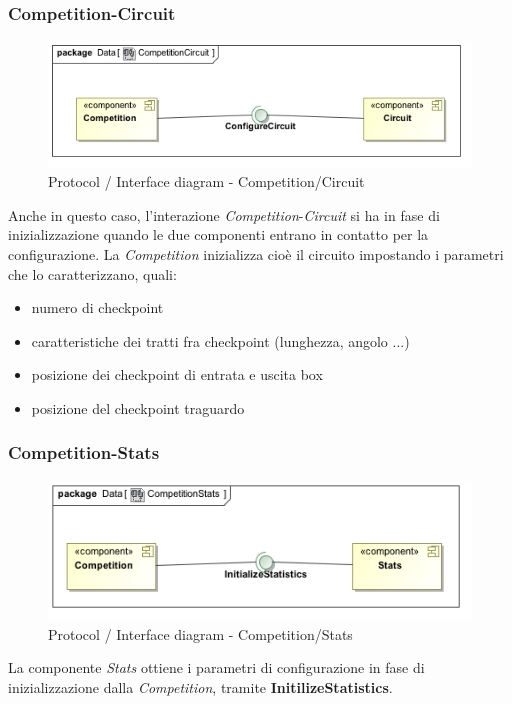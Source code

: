 \subsubsection{Competition-Circuit}
\begin{center}
\begin{figure}[h!]
	\includegraphics[scale=0.55]{img/InteractionDiagram/Implementation_Diagram__CompetitionCircuit.jpg}
\caption{Protocol / Interface diagram - Competition/Circuit}
\end{figure}
\end{center}
Anche in questo caso, l'interazione \emph{Competition}-\emph{Circuit} si ha in fase di inizializzazione quando le due componenti entrano in contatto
per la configurazione. La \emph{Competition} inizializza cio\`{e} il circuito impostando i parametri che lo caratterizzano, quali:
	\begin{itemize}
		\item numero di checkpoint
		\item caratteristiche dei tratti fra checkpoint (lunghezza, angolo ...)
		\item posizione dei checkpoint di entrata e uscita box
		\item posizione del checkpoint traguardo
	\end{itemize}
\subsubsection{Competition-Stats}
\begin{center}
\begin{figure}[h!]
	\includegraphics[scale=0.55]{img/InteractionDiagram/Implementation_Diagram__CompetitionStats.jpg}
\caption{Protocol / Interface diagram - Competition/Stats}
\end{figure}
\end{center}
La componente \emph{Stats} ottiene i parametri di configurazione in fase di inizializzazione dalla \emph{Competition}, tramite
\textbf{InitilizeStatistics}.
\clearpage
